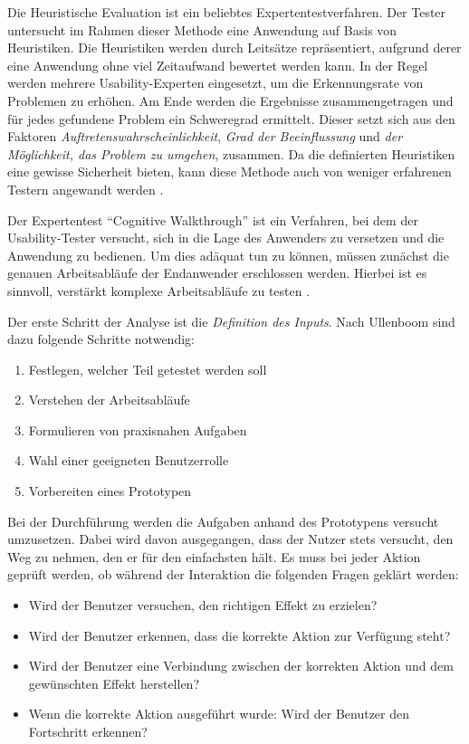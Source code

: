 Die Heuristische Evaluation ist ein beliebtes Expertentestverfahren. Der Tester untersucht im Rahmen dieser Methode eine Anwendung auf Basis von Heuristiken. Die Heuristiken werden durch Leitsätze repräsentiert, aufgrund derer eine Anwendung ohne viel Zeitaufwand bewertet werden kann. In der Regel werden mehrere Usability-Experten eingesetzt, um die Erkennungsrate von Problemen zu erhöhen. Am Ende werden die Ergebnisse zusammengetragen und für jedes gefundene Problem ein Schweregrad ermittelt. Dieser setzt sich aus den Faktoren \textit{Auftretenswahrscheinlichkeit}, \textit{Grad der Beeinflussung} und \textit{der Möglichkeit, das Problem zu umgehen}, zusammen. Da die definierten Heuristiken eine gewisse Sicherheit bieten, kann diese Methode auch von weniger erfahrenen Testern angewandt werden \cite[S. 232f.]{Ullenboom2014}.\par
{}
Der Expertentest \enquote{Cognitive Walkthrough} ist ein Verfahren, bei dem der Usability-Tester versucht, sich in die Lage des Anwenders zu versetzen und die Anwendung zu bedienen. Um dies adäquat tun zu können, müssen zunächst die genauen Arbeitsabläufe der Endanwender erschlossen werden. Hierbei ist es sinnvoll, verstärkt komplexe Arbeitsabläufe zu testen \cite[S. 234]{Ullenboom2014}.\par
Der erste Schritt der Analyse ist die \textit{Definition des Inputs}. Nach Ullenboom sind dazu folgende Schritte notwendig:
\begin{enumerate}
	\item Festlegen, welcher Teil getestet werden soll
	\item Verstehen der Arbeitsabläufe
	\item Formulieren von praxisnahen Aufgaben
	\item Wahl einer geeigneten Benutzerrolle
	\item Vorbereiten eines Prototypen \cite[S. 234]{Ullenboom2014}
\end{enumerate}
Bei der Durchführung werden die Aufgaben anhand des Prototypens versucht umzusetzen. Dabei wird davon ausgegangen, dass der Nutzer stets versucht, den Weg zu nehmen, den er für den einfachsten hält. Es muss bei jeder Aktion geprüft werden, ob während der Interaktion die folgenden Fragen geklärt werden:
\begin{itemize}
	\item Wird der Benutzer versuchen, den richtigen Effekt zu erzielen?
	\item Wird der Benutzer erkennen, dass die korrekte Aktion zur Verfügung steht?
	\item Wird der Benutzer eine Verbindung zwischen der korrekten Aktion und dem gewünschten Effekt herstellen?
	\item Wenn die korrekte Aktion ausgeführt wurde: Wird der Benutzer den Fortschritt erkennen? \cite[S. 234]{Ullenboom2014}
\end{itemize}
